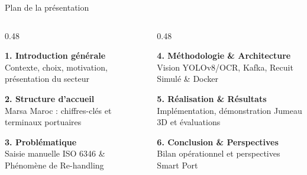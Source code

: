 \documentclass[aspectratio=169,french]{beamer}
\begin{document}
\begin{frame}{Plan de la présentation}
  \vspace{0.2cm}
  \begin{columns}[t]
    \begin{column}{0.48\textwidth}
      \begin{tcolorbox}[cardstyle]
        \small\textbf{\textcolor{RefBlue}{1. Introduction générale}}\\
        \tiny Contexte, choix, motivation, présentation du secteur
      \end{tcolorbox}
      \vspace{0.2cm}
      \begin{tcolorbox}[cardstyle]
        \small\textbf{\textcolor{RefBlue}{2. Structure d'accueil}}\\
        \tiny Marsa Maroc : chiffres-clés et terminaux portuaires
      \end{tcolorbox}
      \vspace{0.2cm}
      \begin{tcolorbox}[cardstyle]
        \small\textbf{\textcolor{RefBlue}{3. Problématique}}\\
        \tiny Saisie manuelle ISO 6346 \& Phénomène de Re-handling
      \end{tcolorbox}
    \end{column}
    
    \begin{column}{0.48\textwidth}
      \begin{tcolorbox}[cardstyle]
        \small\textbf{\textcolor{RefBlue}{4. Méthodologie \& Architecture}}\\
        \tiny Vision YOLOv8/OCR, Kafka, Recuit Simulé \& Docker
      \end{tcolorbox}
      \vspace{0.2cm}
      \begin{tcolorbox}[cardstyle]
        \small\textbf{\textcolor{RefBlue}{5. Réalisation \& Résultats}}\\
        \tiny Implémentation, démonstration Jumeau 3D et évaluations
      \end{tcolorbox}
      \vspace{0.2cm}
      \begin{tcolorbox}[cardstyle]
        \small\textbf{\textcolor{RefBlue}{6. Conclusion \& Perspectives}}\\
        \tiny Bilan opérationnel et perspectives Smart Port
      \end{tcolorbox}
    \end{column}
  \end{columns}
\end{frame}
\end{document}
